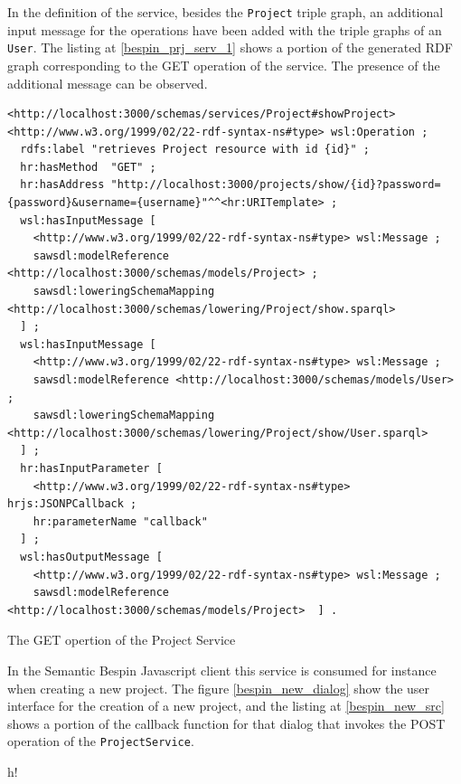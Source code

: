 In the definition of the service, besides the \texttt{Project} triple graph, an additional input message for the operations have
been added with the triple graphs of an \texttt{User}. The listing at \ref{bespin_prj_serv_1} shows a portion of the
generated RDF graph corresponding to the GET operation of the service. The presence of the additional message can be
observed.

\begin{table}
\vspace{5 mm}
\begin{lstlisting}
<http://localhost:3000/schemas/services/Project#showProject> <http://www.w3.org/1999/02/22-rdf-syntax-ns#type> wsl:Operation ;
  rdfs:label "retrieves Project resource with id {id}" ;
  hr:hasMethod  "GET" ;
  hr:hasAddress "http://localhost:3000/projects/show/{id}?password={password}&username={username}"^^<hr:URITemplate> ;
  wsl:hasInputMessage [
    <http://www.w3.org/1999/02/22-rdf-syntax-ns#type> wsl:Message ;
    sawsdl:modelReference <http://localhost:3000/schemas/models/Project> ;
    sawsdl:loweringSchemaMapping <http://localhost:3000/schemas/lowering/Project/show.sparql>
  ] ;
  wsl:hasInputMessage [
    <http://www.w3.org/1999/02/22-rdf-syntax-ns#type> wsl:Message ;
    sawsdl:modelReference <http://localhost:3000/schemas/models/User> ; 
    sawsdl:loweringSchemaMapping <http://localhost:3000/schemas/lowering/Project/show/User.sparql>
  ] ;
  hr:hasInputParameter [
    <http://www.w3.org/1999/02/22-rdf-syntax-ns#type> hrjs:JSONPCallback ;
    hr:parameterName "callback"
  ] ;
  wsl:hasOutputMessage [
    <http://www.w3.org/1999/02/22-rdf-syntax-ns#type> wsl:Message ;
    sawsdl:modelReference <http://localhost:3000/schemas/models/Project>  ] .
\end{lstlisting} 
\vspace{5 mm}
\caption{The GET opertion of the Project Service}
\label{bespin_prj_serv_1}
\end{table}

In the Semantic Bespin Javascript client this service is consumed for instance when creating a new project. The figure
\ref{bespin_new_dialog} show the user interface for the creation of a new project, and the listing at
\ref{bespin_new_src} shows a portion of the callback function for that dialog that invokes the POST operation of the
\texttt{ProjectService}.

\begin{table}{h!}
\noindent{}
\caption{Semantic Bespin new Project dialog}
\label{bespin_new_dialog}
\end{table}

